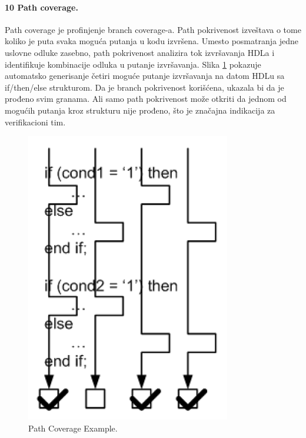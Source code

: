 \documentclass[a4paper, 12pt]{article}
\begin{document}
\paragraph{10 Path coverage.}
\hfill \break
\indent Path coverage je profinjenje branch coverage-a. Path pokrivenost izveštava o tome koliko je puta svaka moguća putanja u kodu izvršena. Umesto posmatranja jedne uslovne odluke zasebno, path pokrivenost analizira tok izvršavanja HDLa i identifikuje kombinacije odluka u putanje izvršavanja. Slika \ref{img-p10-7} pokazuje automatsko generisanje četiri moguće putanje izvršavanja na datom HDLu sa if/then/else strukturom. Da je branch pokrivenost korišćena, ukazala bi da je prođeno svim granama. Ali samo path pokrivenost može otkriti da jednom od mogućih putanja kroz strukturu nije prođeno, što je značajna indikacija za verifikacioni tim.
\begin{figure}[h!]
\centering
\includegraphics[scale=0.5]{img-p10-7.png}
\caption{Path Coverage Example.}
\label{img-p10-7}
\end{figure}
\end{document}
